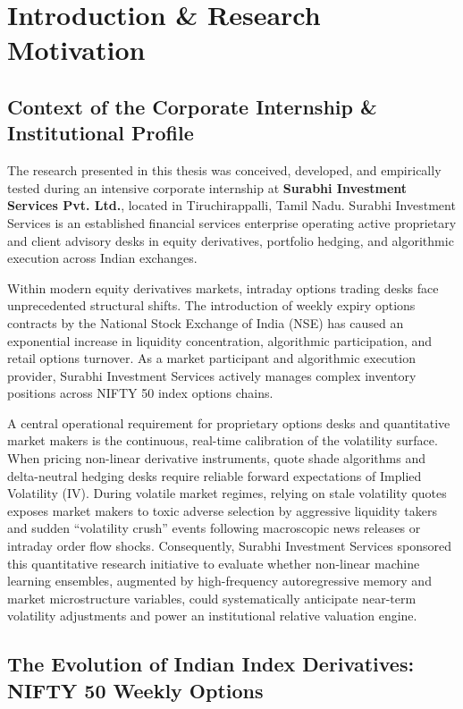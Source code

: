 \chapter{Introduction \& Research Motivation}
\label{chap:introduction}

\section{Context of the Corporate Internship \& Institutional Profile}
\label{sec:institutional_profile}

The research presented in this thesis was conceived, developed, and empirically tested during an intensive corporate internship at \textbf{Surabhi Investment Services Pvt. Ltd.}, located in Tiruchirappalli, Tamil Nadu. Surabhi Investment Services is an established financial services enterprise operating active proprietary and client advisory desks in equity derivatives, portfolio hedging, and algorithmic execution across Indian exchanges. 

Within modern equity derivatives markets, intraday options trading desks face unprecedented structural shifts. The introduction of weekly expiry options contracts by the National Stock Exchange of India (NSE) has caused an exponential increase in liquidity concentration, algorithmic participation, and retail options turnover. As a market participant and algorithmic execution provider, Surabhi Investment Services actively manages complex inventory positions across NIFTY 50 index options chains. 

A central operational requirement for proprietary options desks and quantitative market makers is the continuous, real-time calibration of the volatility surface. When pricing non-linear derivative instruments, quote shade algorithms and delta-neutral hedging desks require reliable forward expectations of Implied Volatility (IV). During volatile market regimes, relying on stale volatility quotes exposes market makers to toxic adverse selection by aggressive liquidity takers and sudden ``volatility crush'' events following macroscopic news releases or intraday order flow shocks. Consequently, Surabhi Investment Services sponsored this quantitative research initiative to evaluate whether non-linear machine learning ensembles, augmented by high-frequency autoregressive memory and market microstructure variables, could systematically anticipate near-term volatility adjustments and power an institutional relative valuation engine.

\section{The Evolution of Indian Index Derivatives: NIFTY 50 Weekly Options}
\label{sec:indian_derivatives}


